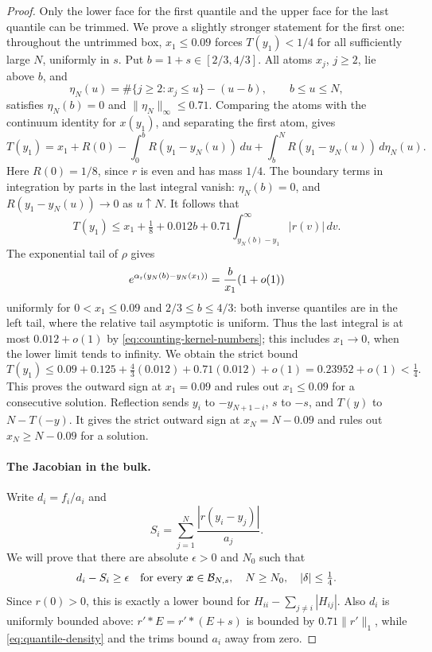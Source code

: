 \begin{proof}
Only the lower face for the first quantile and the upper face for the last quantile can be trimmed. We prove a slightly stronger statement for the first one: throughout the untrimmed box, \(x_1\le0.09\) forces \(T(y_1)<1/4\) for all sufficiently large \(N\), uniformly in \(s\). Put \(b=1+s\in[2/3,4/3]\). All atoms \(x_j\), \(j\ge2\), lie above \(b\), and
\[
 \eta_N(u)=\#\{j\ge2:x_j\le u\}-(u-b),\qquad b\le u\le N,
\]
satisfies \(\eta_N(b)=0\) and \(\|\eta_N\|_\infty\le0.71\). Comparing the atoms with the continuum identity for \(x(y_1)\), and separating the first atom, gives
\[
 T(y_1)=x_1+R(0)-\int_0^b R(y_1-y_N(u))\,du
       +\int_b^N R(y_1-y_N(u))\,d\eta_N(u).
\]
Here \(R(0)=1/8\), since \(r\) is even and has mass \(1/4\). The boundary terms in integration by parts in the last integral vanish: \(\eta_N(b)=0\), and \(R(y_1-y_N(u))\to0\) as \(u\uparrow N\). It follows that
\[
 T(y_1)\le x_1+\tfrac18+0.012b+
 0.71\int_{y_N(b)-y_1}^\infty |r(v)|\,dv.
\]
The exponential tail of \(\rho\) gives
\[
 e^{\alpha_{\rm r}(y_N(b)-y_N(x_1))}
   =\frac b{x_1}(1+o(1))
\]
uniformly for \(0<x_1\le0.09\) and \(2/3\le b\le4/3\): both inverse quantiles are in the left tail, where the relative tail asymptotic is uniform. Thus the last integral is at most \(0.012+o(1)\) by \eqref{eq:counting-kernel-numbers}; this includes \(x_1\to0\), when the lower limit tends to infinity. We obtain the strict bound
\[
 T(y_1)\le0.09+0.125+\tfrac43(0.012)+0.71(0.012)+o(1)
 =0.23952+o(1)<\tfrac14.
\]
This proves the outward sign at \(x_1=0.09\) and rules out \(x_1\le0.09\) for a consecutive solution. Reflection sends \(y_i\) to \(-y_{N+1-i}\), \(s\) to \(-s\), and \(T(y)\) to \(N-T(-y)\). It gives the strict outward sign at \(x_N=N-0.09\) and rules out \(x_N\ge N-0.09\) for a solution.

\paragraph{The Jacobian in the bulk.}
Write \(d_i=f_i/a_i\) and
\[
 S_i=\sum_{j=1}^N\frac{|r(y_i-y_j)|}{a_j}.
\]
We will prove that there are absolute \(\epsilon>0\) and \(N_0\) such that
\begin{equation}\label{eq:counting-dominance}
 d_i-S_i\ge\epsilon
 \quad\hbox{for every }\boldsymbol x\in\mathcal B_{N,s},
 \quad N\ge N_0,\quad |\delta|\le\tfrac14.
\end{equation}
Since \(r(0)>0\), this is exactly a lower bound for
\(H_{ii}-\sum_{j\ne i}|H_{ij}|\). Also \(d_i\) is uniformly bounded above: \(r'*E=r'*(E+s)\) is bounded by \(0.71\|r'\|_1\), while \eqref{eq:quantile-density} and the trims bound \(a_i\) away from zero.


\end{proof}
